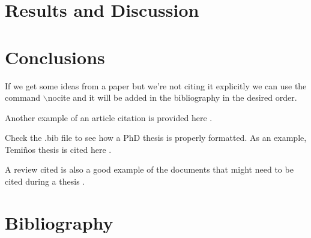 \documentclass[11pt]{article}
\begin{document}
\section{Results and Discussion}

\newpage

\section{Conclusions}
If we get some ideas from a paper but we're not citing it explicitly we can use the command $\backslash$nocite and it will be added in the bibliography in the desired order\nocite{Lamport2018}. %

Another example of an article citation is provided here\autocite{Foster2019} . %

Check the .bib file to see how a PhD thesis is properly formatted. As an example, Temiños thesis is cited here\autocite{TeminoGutierrez2019} .

A review cited is also a good example of the documents that might need to be cited during a thesis\autocite{Bronstein2020} .
\newpage

\section{Bibliography}


\printbibliography[title = { \vspace{-1cm}}]
\end{document}
